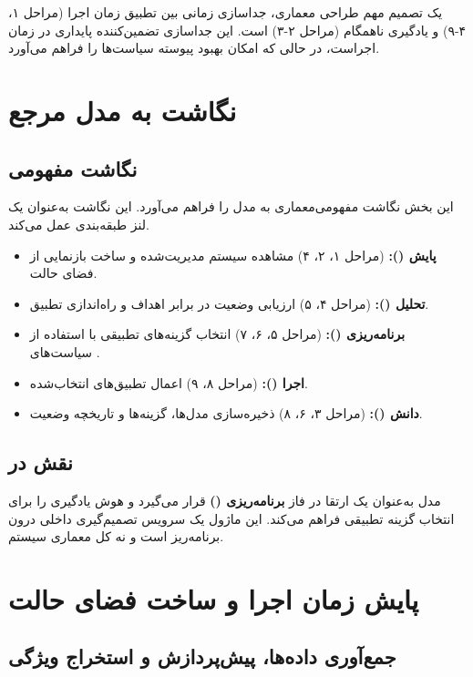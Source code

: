 \documentclass[oneside,openany,phd]{TMU-Thesis}
\begin{document}
یک تصمیم مهم طراحی معماری، جداسازی زمانی بین تطبیق زمان اجرا (مراحل ۱، ۴-۹) و یادگیری ناهمگام (مراحل ۲-۳) است. این جداسازی تضمین‌کننده پایداری در زمان اجراست، در حالی که امکان بهبود پیوسته سیاست‌ها را فراهم می‌آورد.

\section{نگاشت به مدل مرجع }

\subsection{نگاشت مفهومی}

این بخش نگاشت مفهومی‌معماری  به مدل  را فراهم می‌آورد. این نگاشت به‌عنوان یک لنز طبقه‌بندی عمل می‌کند.
\begin{itemize}
    \item \textbf{پایش ():} (مراحل ۱، ۲، ۴) مشاهده سیستم مدیریت‌شده و ساخت بازنمایی از فضای حالت.
    \item \textbf{تحلیل ():} (مراحل ۴، ۵) ارزیابی وضعیت در برابر اهداف و راه‌اندازی تطبیق.
    \item \textbf{برنامه‌ریزی ():} (مراحل ۵، ۶، ۷) انتخاب گزینه‌های تطبیقی با استفاده از سیاست‌های .
    \item \textbf{اجرا ():} (مراحل ۸، ۹) اعمال تطبیق‌های انتخاب‌شده.
    \item \textbf{دانش ():} (مراحل ۳، ۶، ۸) ذخیره‌سازی مدل‌ها، گزینه‌ها و تاریخچه وضعیت.
\end{itemize}

\subsection{نقش  در }

مدل  به‌عنوان یک ارتقا در فاز \textbf{برنامه‌ریزی ()} قرار می‌گیرد و هوش یادگیری را برای انتخاب گزینه تطبیقی فراهم می‌کند. این ماژول یک سرویس تصمیم‌گیری داخلی درون برنامه‌ریز است و نه کل معماری سیستم.

\section{پایش زمان اجرا و ساخت فضای حالت}

\subsection{جمع‌آوری داده‌ها، پیش‌پردازش و استخراج ویژگی}
\end{document}
